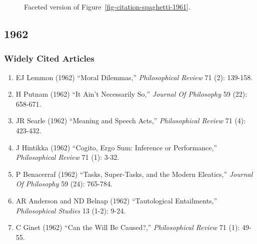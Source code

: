 \documentclass[
  10pt,
  letterpaper,
  DIV=11,
  numbers=noendperiod,
  twoside]{scrartcl}
\providecommand{\tightlist}{%
  \setlength{\itemsep}{0pt}\setlength{\parskip}{0pt}}\usepackage{longtable,booktabs,array}
\begin{document}
\begin{figure}


\caption{\label{fig-citation-facet-1961}Faceted version of
Figure~\ref{fig-citation-spaghetti-1961}.}

\end{figure}%

\newpage

\subsection{1962}\label{sec-s1962}

\subsubsection*{Widely Cited Articles}\label{widely-cited-articles-6}

\begin{enumerate}
\def\labelenumi{\arabic{enumi}.}
\tightlist
\item
  EJ Lemmon (1962) ``Moral Dilemmas,'' \emph{Philosophical Review} 71
  (2): 139-158.
\item
  H Putnam (1962) ``It Ain't Necessarily So,'' \emph{Journal Of
  Philosophy} 59 (22): 658-671.
\item
  JR Searle (1962) ``Meaning and Speech Acts,'' \emph{Philosophical
  Review} 71 (4): 423-432.
\item
  J Hintikka (1962) ``Cogito, Ergo Sum: Inference or Performance,''
  \emph{Philosophical Review} 71 (1): 3-32.
\item
  P Benacerraf (1962) ``Tasks, Super-Tasks, and the Modern Eleatics,''
  \emph{Journal Of Philosophy} 59 (24): 765-784.
\item
  AR Anderson and ND Belnap (1962) ``Tautological Entailments,''
  \emph{Philosophical Studies} 13 (1-2): 9-24.
\item
  C Ginet (1962) ``Can the Will Be Caused?,'' \emph{Philosophical
  Review} 71 (1): 49-55.
\end{enumerate}
\end{document}
